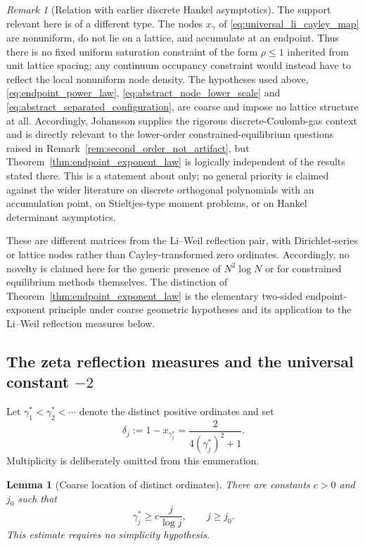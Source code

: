 \documentclass[11pt]{amsart}
\numberwithin{equation}{section}
\theoremstyle{plain}
\newtheorem{lemma}[theorem]{Lemma}
\theoremstyle{definition}
\theoremstyle{remark}
\newtheorem{remark}[theorem]{Remark}
\begin{document}
\begin{remark}[Relation with earlier discrete Hankel asymptotics]
The support relevant here is of a different type.  The nodes $x_\gamma$ of \eqref{eq:universal_li_cayley_map} are nonuniform, do not lie on a lattice, and accumulate at an endpoint.  Thus there is no fixed uniform saturation constraint of the form $\rho\le1$ inherited from unit lattice spacing; any continuum occupancy constraint would instead have to reflect the local nonuniform node density.  The hypotheses used above, \eqref{eq:endpoint_power_law}, \eqref{eq:abstract_node_lower_scale} and \eqref{eq:abstract_separated_configuration}, are coarse and impose no lattice structure at all.  Accordingly, Johansson supplies the rigorous discrete-Coulomb-gas context and is directly relevant to the lower-order constrained-equilibrium questions raised in Remark~\ref{rem:second_order_not_artifact}, but Theorem~\ref{thm:endpoint_exponent_law} is logically independent of the results stated there.  This is a statement about \cite{Johansson2001} only; no general priority is claimed against the wider literature on discrete orthogonal polynomials with an accumulation point, on Stieltjes-type moment problems, or on Hankel determinant asymptotics.

These are different matrices from the Li--Weil reflection pair, with Dirichlet-series or lattice nodes rather than Cayley-transformed zero ordinates. Accordingly, no novelty is claimed here for the generic presence of $N^2\log N$ or for constrained equilibrium methods themselves. The distinction of Theorem~\ref{thm:endpoint_exponent_law} is the elementary two-sided endpoint-exponent principle under coarse geometric hypotheses and its application to the Li--Weil reflection measures below.
\end{remark}

\subsection{\texorpdfstring{The zeta reflection measures and the universal constant $-2$}{The zeta reflection measures and the universal constant -2}}

Let $\gamma_1^*<\gamma_2^*<\cdots$ denote the distinct positive ordinates and set
\begin{equation}
\delta_j:=1-x_{\gamma_j^*}=\frac{2}{4(\gamma_j^*)^2+1}.
\label{eq:delta_distinct_nodes}
\end{equation}
Multiplicity is deliberately omitted from this enumeration.

\begin{lemma}[Coarse location of distinct ordinates]
\label{lem:distinct_ordinate_lower_bound}
There are constants $c>0$ and $j_0$ such that
\begin{equation}
\gamma_j^*\ge c\frac{j}{\log j},
\qquad j\ge j_0.
\label{eq:distinct_gamma_lower_bound}
\end{equation}
This estimate requires no simplicity hypothesis.
\end{lemma}
\end{document}
